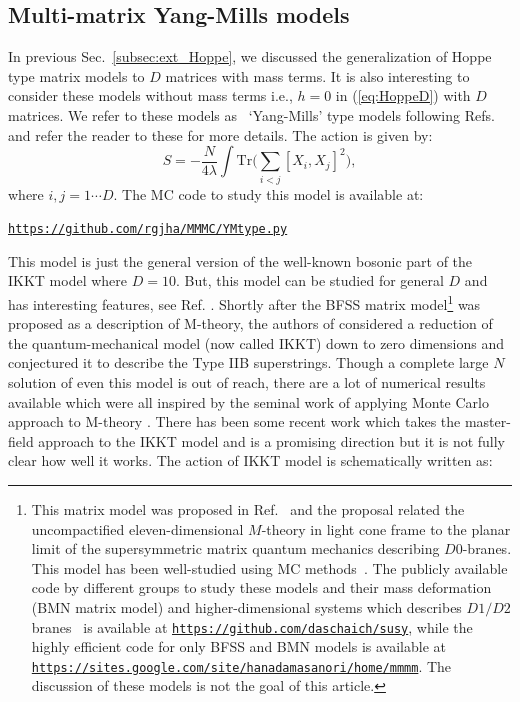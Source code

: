 \documentclass[letter,11pt]{article}
\begin{document}
\subsection{Multi-matrix Yang-Mills models}
In previous Sec.~\ref{subsec:ext_Hoppe}, we discussed the generalization of Hoppe type matrix models to $D$ matrices with mass terms. It is also interesting to consider these models without mass terms i.e., $h=0$ in (\ref{eq:HoppeD}) with $D$ matrices. We refer to these models as ~`Yang-Mills' type models following Refs.~\cite{Krauth:1998yu,Krauth:1999qw} and refer the reader to these for more details. The action is given by: 
\begin{equation}
	\label{eq:CTmodel} 
S = -\frac{N}{4\lambda} \int \mbox{Tr} \Bigg( \sum_{i < j}[X_i, X_j]^{2}\Bigg), 
\end{equation}
where $i, j = 1 \cdots D$. The MC code to study this model is available at:
\begin{center} \texttt{\href{https://github.com/rgjha/MMMC/blob/main/YMtype.py}{https://github.com/rgjha/MMMC/YMtype.py}} \end{center}
This model is just the general version of the well-known bosonic part of the IKKT model where $D=10$. But, this model can be studied for general $D$ and has interesting features, see Ref. \cite{Hotta:1998en}. 
Shortly after the BFSS matrix model\footnote{This matrix model was proposed in Ref.~\cite{Banks:1996vh} and the proposal related the uncompactified eleven-dimensional $M$-theory in light cone frame to the planar limit of the supersymmetric matrix quantum mechanics describing $D0$-branes. This model has been well-studied using MC methods~\cite{Hanada:2007ti, Catterall:2007fp, Anagnostopoulos:2007fw, Hanada:2008ez,Filev:2015hia,Berkowitz:2016tyy}. 
The publicly available code by different groups 
to study these models and their mass deformation (BMN matrix model) and higher-dimensional systems which describes $D1/D2$ branes~\cite{Catterall:2017lub,Jha:2017zad,Catterall:2020nmn}
is available at \texttt{\href{https://github.com/daschaich/susy}{https://github.com/daschaich/susy}}, while the
highly efficient code for only BFSS and BMN models is available at
\texttt{\href{https://sites.google.com/site/hanadamasanori/home/mmmm}
{https://sites.google.com/site/hanadamasanori/home/mmmm}}.
The discussion of these models is not the goal of this article. 
}
was proposed as a description of M-theory, the authors of 
\cite{Ishibashi:1996xs} considered a reduction of the quantum-mechanical model (now called IKKT) down to zero 
dimensions and conjectured it to describe the Type IIB superstrings. Though a complete large $N$ solution of even this model is out of reach, there are a lot of numerical results available which were all inspired by the seminal work of applying Monte Carlo approach to M-theory \cite{Krauth:1998xh}. There has been some recent work which takes the master-field approach to the IKKT model \cite{Klinkhamer:2021wrv} and is a promising direction but it is not fully clear how well it works. The action of IKKT model is schematically written as:
\end{document}
